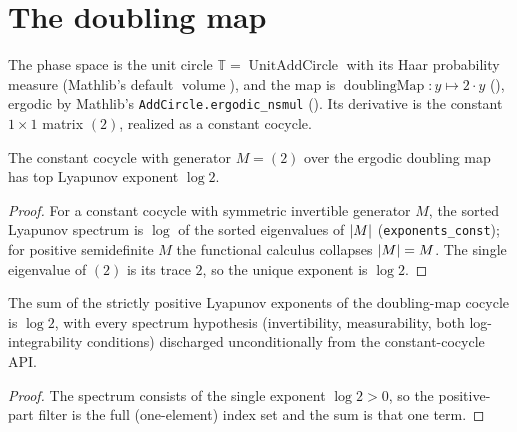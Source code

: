 \section{The doubling map}

The phase space is the unit circle \(\mathbb{T} = \operatorname{UnitAddCircle}\) with its Haar
probability measure (Mathlib's default \(\operatorname{volume}\)), and the map is
\(\operatorname{doublingMap}: y\mapsto 2\cdot y\)
(), ergodic by Mathlib's
\texttt{AddCircle.ergodic\_nsmul} (). Its derivative
is the constant \(1\times 1\) matrix \((2)\), realized as a constant cocycle.

\begin{theorem}\label{doublingMap_topExponent_eq_log_two}
  \leanok
  The constant cocycle with generator \(M = (2)\) over the ergodic doubling map has top Lyapunov
  exponent \(\log 2\).
\end{theorem}
\begin{proof}\leanok
  For a constant cocycle with symmetric invertible generator \(M\), the sorted Lyapunov spectrum
  is \(\log\) of the sorted eigenvalues of \(\left\lvert M \right\rvert\)
  (\texttt{exponents\_const}); for positive semidefinite \(M\) the functional calculus
  collapses \(\left\lvert M \right\rvert = M\). The single eigenvalue of \((2)\) is its trace \(2\), so the unique
  exponent is \(\log 2\).
\end{proof}

\begin{corollary}\label{doublingMap_sumPosExp_eq_log_two}
  \leanok
  The sum of the strictly positive Lyapunov exponents of the doubling-map cocycle is \(\log 2\),
  with every spectrum hypothesis (invertibility, measurability, both log-integrability conditions)
  discharged unconditionally from the constant-cocycle API.
\end{corollary}
\begin{proof}\leanok
  The spectrum consists of the single exponent \(\log 2 > 0\), so the positive-part filter is the
  full (one-element) index set and the sum is that one term.
\end{proof}

